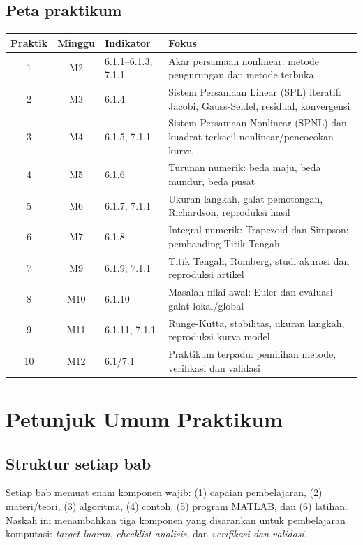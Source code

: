 \documentclass[book,english,noindex,lean,nobackpage,nocopyright,noupdate,nofiglist,notablist]{enacom}
\begin{document}
\section*{Peta praktikum}
\renewcommand{\arraystretch}{1.25}
\begin{tabularx}{\textwidth}{c c p{} X}
\hline
\textbf{Praktik} & \textbf{Minggu} & \textbf{Indikator} & \textbf{Fokus}\\\hline
1 & M2 & 6.1.1--6.1.3, 7.1.1 & Akar persamaan nonlinear: metode pengurungan dan metode terbuka\\
2 & M3 & 6.1.4 & Sistem Persamaan Linear (SPL) iteratif: Jacobi, Gauss-Seidel, residual, konvergensi\\
3 & M4 & 6.1.5, 7.1.1 & Sistem Persamaan Nonlinear (SPNL) dan kuadrat terkecil nonlinear/pencocokan kurva\\
4 & M5 & 6.1.6 & Turunan numerik: beda maju, beda mundur, beda pusat\\
5 & M6 & 6.1.7, 7.1.1 & Ukuran langkah, galat pemotongan, Richardson, reproduksi hasil\\
6 & M7 & 6.1.8 & Integral numerik: Trapezoid dan Simpson; pembanding Titik Tengah\\
7 & M9 & 6.1.9, 7.1.1 & Titik Tengah, Romberg, studi akurasi dan reproduksi artikel\\
8 & M10 & 6.1.10 & Masalah nilai awal: Euler dan evaluasi galat lokal/global\\
9 & M11 & 6.1.11, 7.1.1 & Runge-Kutta, stabilitas, ukuran langkah, reproduksi kurva model\\
10 & M12 & 6.1/7.1 & Praktikum terpadu: pemilihan metode, verifikasi dan validasi\\\hline
\end{tabularx}

\chapter*{Petunjuk Umum Praktikum}
\section*{Struktur setiap bab}
Setiap bab memuat enam komponen wajib: (1) capaian pembelajaran, (2) materi/teori, (3) algoritma, (4) contoh, (5) program MATLAB, dan (6) latihan. Naskah ini menambahkan tiga komponen yang disarankan untuk pembelajaran komputasi: \textit{target luaran}, \textit{checklist analisis}, dan \textit{verifikasi dan validasi}.
\end{document}
